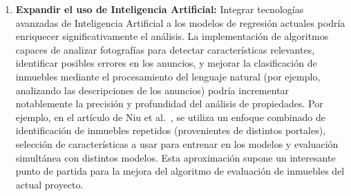 \begin{enumerate}
  \item \textbf{Expandir el uso de Inteligencia Artificial:} Integrar tecnologías avanzadas de Inteligencia Artificial a los modelos de regresión actuales podría enriquecer significativamente el análisis. La implementación de algoritmos capaces de analizar fotografías para detectar características relevantes, identificar posibles errores en los anuncios, y mejorar la clasificación de inmuebles mediante el procesamiento del lenguaje natural (por ejemplo, analizando las descripciones de los anuncios) podría incrementar notablemente la precisión y profundidad del análisis de propiedades. Por ejemplo, en el artículo de Niu et al.~\cite{niu2019}, se utiliza un enfoque combinado de identificación de inmuebles repetidos (provenientes de distintos portales), selección de características a usar para entrenar en los modelos y evaluación simultánea con distintos modelos. Esta aproximación supone un interesante punto de partida para la mejora del algoritmo de evaluación de inmuebles del actual proyecto.


\end{enumerate}


